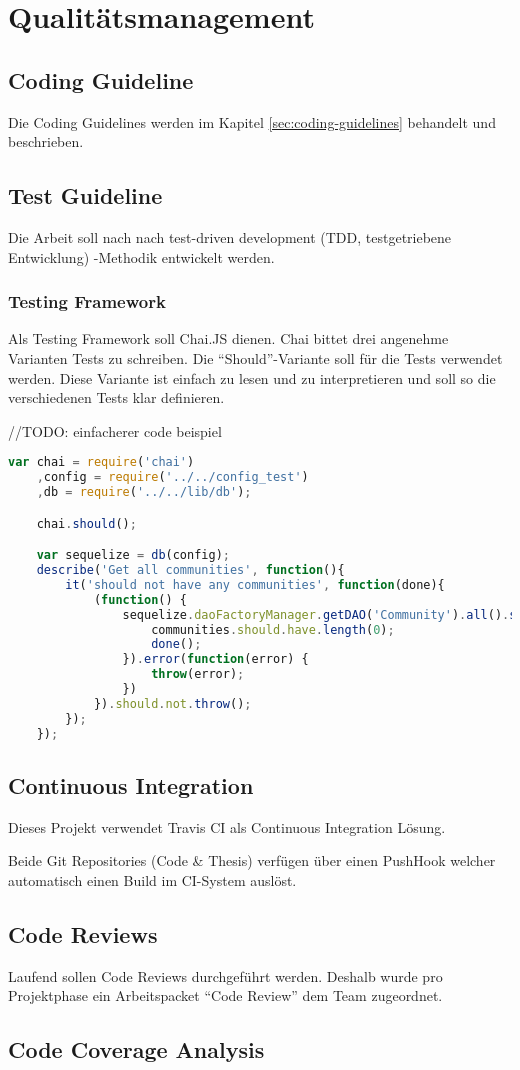 \chapter{Qualitätsmanagement}


\section{Coding Guideline}
Die Coding Guidelines werden im Kapitel \ref{sec:coding-guidelines}  behandelt und beschrieben.


\section{Test Guideline}
Die Arbeit soll nach nach test-driven development (TDD, testgetriebene Entwicklung) -Methodik entwickelt werden.

\subsection*{Testing Framework}
Als Testing Framework soll Chai.JS \cite{ChaiJS} dienen. Chai bittet drei angenehme Varianten Tests zu schreiben. Die ``Should''-Variante soll für die Tests verwendet werden. Diese Variante ist einfach zu lesen und zu interpretieren und soll so die verschiedenen Tests klar definieren. \newline

//TODO: einfacherer code beispiel
\begin{lstlisting}[language=JavaScript, caption=Chai.js Should Beispiel]
var chai = require('chai')
	,config = require('../../config_test')
	,db = require('../../lib/db');

	chai.should();

	var sequelize = db(config);
	describe('Get all communities', function(){
		it('should not have any communities', function(done){
			(function() {
				sequelize.daoFactoryManager.getDAO('Community').all().success(function(communities) {
					communities.should.have.length(0);
					done();
				}).error(function(error) {
					throw(error);
				})
			}).should.not.throw();
		});
	});
\end{lstlisting}


\section{Continuous Integration}
Dieses Projekt verwendet Travis CI als Continuous Integration Lösung.

Beide Git Repositories (Code \& Thesis) verfügen über einen \gls{PushHook} welcher automatisch einen Build im CI-System auslöst.


\section{Code Reviews}
Laufend sollen Code Reviews durchgeführt werden. Deshalb wurde pro Projektphase ein Arbeitspacket ``Code Review'' dem Team zugeordnet.


\section{Code Coverage Analysis}

